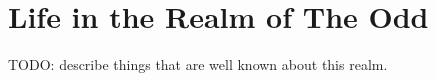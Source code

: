 \section*{\centering Life in the Realm of The Odd}
\vspace*{0.4 cm}

TODO: describe things that are well known about this realm.



